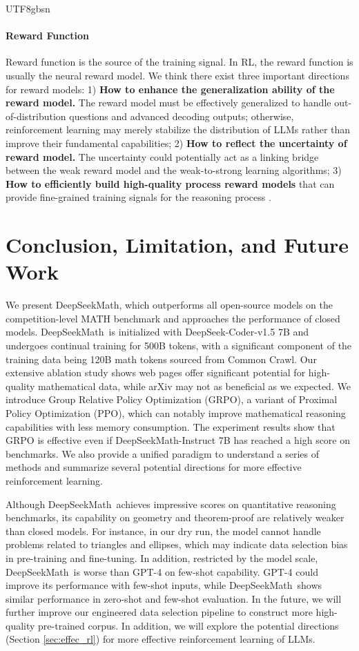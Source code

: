 \documentclass[11pt, a4paper, logo, copyright, nonumbering]{deepseek}
\newcommand{\spmath}{DeepSeekMath}
\begin{document}
\begin{CJK*}{UTF8}{gbsn}
\paragraph{Reward Function} Reward function is the source of the training signal.
In RL, the reward function is usually the neural reward model.
We think there exist three important directions for reward models:
1) \textbf{How to enhance the generalization ability of the reward model.} The reward model must be effectively generalized to handle out-of-distribution questions and advanced decoding outputs; otherwise, reinforcement learning may merely stabilize the distribution of LLMs rather than improve their fundamental capabilities;
2) \textbf{How to reflect the uncertainty of reward model.} The uncertainty could potentially act as a linking bridge between the weak reward model and the weak-to-strong learning algorithms;
3) \textbf{How to efficiently build high-quality process reward models} that can provide fine-grained training signals for the reasoning process \citep{lightman2023let,wang2023math}.

\section{Conclusion, Limitation, and Future Work}
We present \spmath, which outperforms all open-source models on the competition-level MATH benchmark and approaches the performance of closed models.
\spmath~is initialized with DeepSeek-Coder-v1.5 7B and undergoes continual training for 500B tokens, with a significant component of the training data being 120B math tokens sourced from Common Crawl.
Our extensive ablation study shows web pages offer significant potential for high-quality mathematical data, while arXiv may not as beneficial as we expected.
We introduce Group Relative Policy Optimization (GRPO), a variant of Proximal Policy Optimization (PPO), which can notably improve mathematical reasoning capabilities with less memory consumption.
The experiment results show that GRPO is effective even if \spmath-Instruct 7B has reached a high score on benchmarks. 
We also provide a unified paradigm to understand a series of methods and summarize several potential directions for more effective reinforcement learning.

Although \spmath~achieves impressive scores on quantitative reasoning benchmarks, its capability on geometry and theorem-proof are relatively weaker than closed models.
For instance, in our dry run, the model cannot handle problems related to triangles and ellipses, which may indicate data selection bias in pre-training and fine-tuning. In addition, restricted by the model scale, \spmath~is worse than GPT-4 on few-shot capability.
GPT-4 could improve its performance with few-shot inputs, while \spmath~shows similar performance in zero-shot and few-shot evaluation.
In the future, we will further improve our engineered data selection pipeline to construct more high-quality pre-trained corpus.
In addition, we will explore the potential directions (Section \ref{sec:effec_rl}) for more effective reinforcement learning of LLMs.


\end{CJK*}
\end{document}
